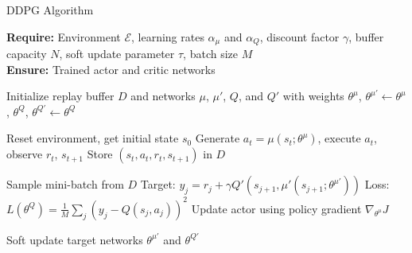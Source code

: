 \documentclass[conference]{IEEEtran}
\begin{document}
%

\begin{algorithm}
\caption{DDPG Algorithm}
\textbf{Require:} Environment $\mathcal{E}$, learning rates $\alpha_{\mu}$ and $\alpha_{Q}$, discount factor $\gamma$, buffer capacity $N$, soft update parameter $\tau$, batch size $M$ \\
\textbf{Ensure:} Trained actor and critic networks

\begin{algorithmic}[0]
\State Initialize replay buffer $D$ and networks $\mu$, $\mu'$, $Q$, and $Q'$ with weights $\theta^{\mu}$, $\theta^{\mu'} \leftarrow \theta^{\mu}$, $\theta^{Q}$, $\theta^{Q'} \leftarrow \theta^{Q}$

    \State Reset environment, get initial state $s_0$
        \State Generate $a_t = \mu(s_t; \theta^{\mu})$, execute $a_t$, observe $r_t$, $s_{t+1}$
        \State Store $(s_t, a_t, r_t, s_{t+1})$ in $D$
        

            \State Sample mini-batch from $D$
            \State Target: $y_j = r_j + \gamma Q'(s_{j+1}, \mu'(s_{j+1}; \theta^{\mu'}))$
            \State Loss: $L(\theta^{Q}) = \frac{1}{M} \sum_j (y_j - Q(s_j, a_j))^2$
            \State Update actor using policy gradient $\nabla_{\theta^{\mu}} J$
        \EndIf
    
        \State Soft update target networks $\theta^{\mu'}$ and $\theta^{Q'}$
    \EndWhile

\EndFor

\end{algorithmic}
\end{algorithm}
\end{document}
